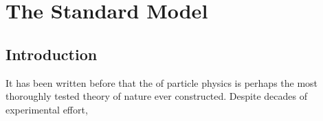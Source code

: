 
\chapter{The Standard Model}
\section{Introduction}
It has been written before that the  of particle physics is perhaps the
most thoroughly tested theory of nature ever constructed. Despite decades of experimental effort,
